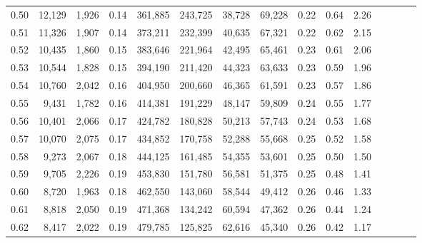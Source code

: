 \begin{tabular}{rrrcrrrrrrrrrrr}
0.50 &  12,129 &  1,926 &                                       0.14 &  361,885 &  243,725 &   38,728 &   69,228 &  0.22 &  0.64 &                         2.26 \\
0.51 &  11,326 &  1,907 &                                       0.14 &  373,211 &  232,399 &   40,635 &   67,321 &  0.22 &  0.62 &                         2.15 \\
0.52 &  10,435 &  1,860 &                                       0.15 &  383,646 &  221,964 &   42,495 &   65,461 &  0.23 &  0.61 &                         2.06 \\
0.53 &  10,544 &  1,828 &                                       0.15 &  394,190 &  211,420 &   44,323 &   63,633 &  0.23 &  0.59 &                         1.96 \\
0.54 &  10,760 &  2,042 &                                       0.16 &  404,950 &  200,660 &   46,365 &   61,591 &  0.23 &  0.57 &                         1.86 \\
0.55 &   9,431 &  1,782 &                                       0.16 &  414,381 &  191,229 &   48,147 &   59,809 &  0.24 &  0.55 &                         1.77 \\
0.56 &  10,401 &  2,066 &                                       0.17 &  424,782 &  180,828 &   50,213 &   57,743 &  0.24 &  0.53 &                         1.68 \\
0.57 &  10,070 &  2,075 &                                       0.17 &  434,852 &  170,758 &   52,288 &   55,668 &  0.25 &  0.52 &                         1.58 \\
0.58 &   9,273 &  2,067 &                                       0.18 &  444,125 &  161,485 &   54,355 &   53,601 &  0.25 &  0.50 &                         1.50 \\
0.59 &   9,705 &  2,226 &                                       0.19 &  453,830 &  151,780 &   56,581 &   51,375 &  0.25 &  0.48 &                         1.41 \\
0.60 &   8,720 &  1,963 &                                       0.18 &  462,550 &  143,060 &   58,544 &   49,412 &  0.26 &  0.46 &                         1.33 \\
0.61 &   8,818 &  2,050 &                                       0.19 &  471,368 &  134,242 &   60,594 &   47,362 &  0.26 &  0.44 &                         1.24 \\
0.62 &   8,417 &  2,022 &                                       0.19 &  479,785 &  125,825 &   62,616 &   45,340 &  0.26 &  0.42 &                         1.17 \\

\end{tabular}
